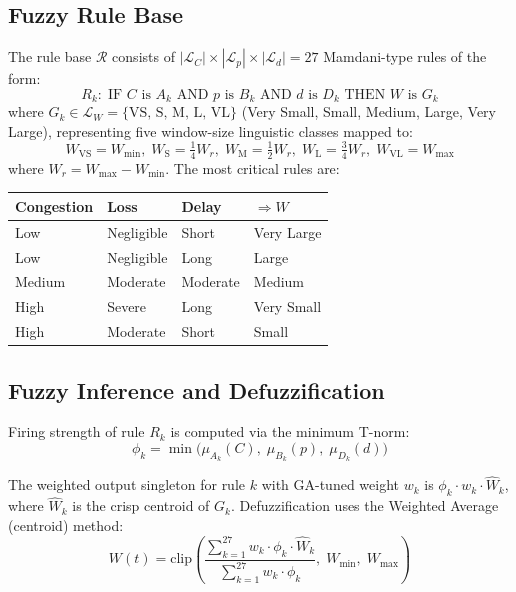 \documentclass[10pt, twocolumn]{IEEEtran}
\theoremstyle{definition}
\begin{document}
\subsection{Fuzzy Rule Base}

The rule base $\mathcal{R}$ consists of $|\mathcal{L}_C| \times |\mathcal{L}_p| \times |\mathcal{L}_d| = 27$ Mamdani-type rules of the form:
\begin{equation}
  R_k:\; \text{IF } C \text{ is } A_k \text{ AND } p \text{ is } B_k \text{ AND } d \text{ is } D_k \text{ THEN } W \text{ is } G_k
\end{equation}
where $G_k \in \mathcal{L}_W = \{\text{VS, S, M, L, VL}\}$ (Very Small, Small, Medium, Large, Very Large), representing five window-size linguistic classes mapped to:
\begin{equation}
  W_{\text{VS}} = W_{\min},\; W_{\text{S}} = \tfrac{1}{4}W_r,\; W_{\text{M}} = \tfrac{1}{2}W_r,\; W_{\text{L}} = \tfrac{3}{4}W_r,\; W_{\text{VL}} = W_{\max}
\end{equation}
where $W_r = W_{\max} - W_{\min}$. The most critical rules are:

\begin{center}
\small
\begin{tabular}{llll}
\toprule
Congestion & Loss & Delay & $\Rightarrow W$ \\
\midrule
Low  & Negligible & Short    & Very Large \\
Low  & Negligible & Long     & Large \\
Medium & Moderate & Moderate & Medium \\
High & Severe    & Long     & Very Small \\
High & Moderate  & Short    & Small \\
\bottomrule
\end{tabular}
\end{center}

\subsection{Fuzzy Inference and Defuzzification}

Firing strength of rule $R_k$ is computed via the minimum T-norm:
\begin{equation}
  \phi_k = \min\!\bigl(\mu_{A_k}(C),\; \mu_{B_k}(p),\; \mu_{D_k}(d)\bigr)
  \label{eq:firing}
\end{equation}

The weighted output singleton for rule $k$ with GA-tuned weight $w_k$ is $\phi_k \cdot w_k \cdot \hat{W}_k$, where $\hat{W}_k$ is the crisp centroid of $G_k$. Defuzzification uses the Weighted Average (centroid) method:
\begin{equation}
  W(t) = \text{clip}\!\left(\frac{\displaystyle\sum_{k=1}^{27} w_k \cdot \phi_k \cdot \hat{W}_k}{\displaystyle\sum_{k=1}^{27} w_k \cdot \phi_k},\; W_{\min},\; W_{\max}\right)
  \label{eq:defuzz}
\end{equation}
\end{document}
